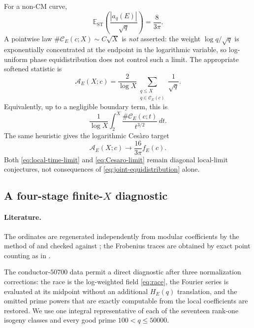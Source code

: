 \documentclass[11pt,reqno]{amsart}
\theoremstyle{remark}
\newcommand{\ST}{\mathrm{ST}}
\begin{document}
For a non-CM curve,
\begin{equation}
  \mathbb E_{\ST}\!\left(\frac{|a_q(E)|}{\sqrt q}\right)
  =\frac{8}{3\pi}.
  \label{eq:ST-amplitude}
\end{equation}
A pointwise law $\#\mathcal C_E(c;X)\sim C\sqrt X$ is \emph{not} asserted: the weight $\log q/\sqrt q$ is exponentially concentrated at the endpoint in the logarithmic variable, so log-uniform phase equidistribution does not control such a limit.  The appropriate softened statistic is
\begin{equation}
  \mathcal A_E(X;c)
  =\frac{2}{\log X}
  \sum_{\substack{q\le X\\q\in\mathcal C_E(c)}}\frac{1}{\sqrt q}.
  \label{eq:Cesaro-count}
\end{equation}
Equivalently, up to a negligible boundary term, this is
\begin{equation}
  \frac{1}{\log X}
  \int_2^X\frac{\#\mathcal C_E(c;t)}{t^{3/2}}\,dt.
\end{equation}
The same heuristic gives the logarithmic Ces\`aro target
\begin{equation}
  \boxed{
  \mathcal A_E(X;c)\longrightarrow
  \frac{16}{3\pi}f_E(c).
  }
  \label{eq:Cesaro-limit}
\end{equation}
Both \eqref{eq:local-time-limit} and \eqref{eq:Cesaro-limit} remain diagonal local-limit conjectures, not consequences of \cref{eq:joint-equidistribution} alone.

\subsection{A four-stage finite-$X$ diagnostic}
\label{subsec:50700-crossing-pilot}

\paragraph{Literature.}
The ordinates are regenerated independently from modular coefficients by the method of \cite{Dokchitser2004,RubinsteinLNS2005} and checked against \cite{LMFDB}; the Frobenius traces are obtained by exact point counting as in \cite{Cremona1997}.

The conductor-$50700$ data permit a direct diagnostic after three normalization corrections: the race is the log-weighted field \eqref{eq:race}, the Fourier series is evaluated at its midpoint without an additional $H_E(q)$ translation, and the omitted prime powers that are exactly computable from the local coefficients are restored.  We use one integral representative of each of the seventeen rank-one isogeny classes and every good prime $100<q\le50000$.
\end{document}
